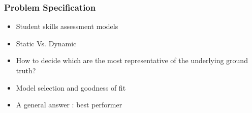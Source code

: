 \documentclass{beamer}
\begin{document}
\begin{frame}\frametitle{Problem Specification}

\begin{itemize}
\vspace{0.5cm}
\item<1-> Student skills assessment models 
\item<2-> Static  Vs. Dynamic 
\item<3-> How to decide which are the most representative of the underlying ground truth? %
\item<4-> Model selection and goodness of fit 
\item<4-> A general answer : best performer %


\end{itemize}
\end{frame}
\end{document}
